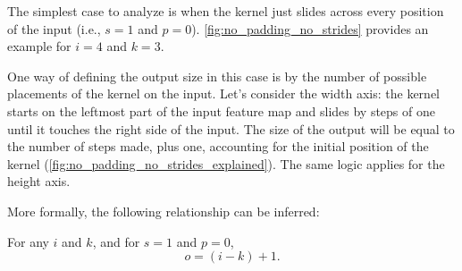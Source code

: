 The simplest case to analyze is when the kernel just slides across every
position of the input (i.e., $s = 1$ and $p = 0$).
\autoref{fig:no_padding_no_strides} provides an example for $i = 4$ and $k =
3$.

One way of defining the output size in this case is by the number of possible
placements of the kernel on the input. Let's consider the width axis: the kernel
starts on the leftmost part of the input feature map and slides by steps of one
until it touches the right side of the input. The size of the output will be
equal to the number of steps made, plus one, accounting for the initial position
of the kernel (\autoref{fig:no_padding_no_strides_explained}). The same logic
applies for the height axis.

More formally, the following relationship can be inferred:

\begin{relationship}\label{rel:no_padding_no_strides}
For any $i$ and $k$, and for $s = 1$ and $p = 0$,
\begin{equation*}
    o = (i - k) + 1.
\end{equation*}
\end{relationship}

